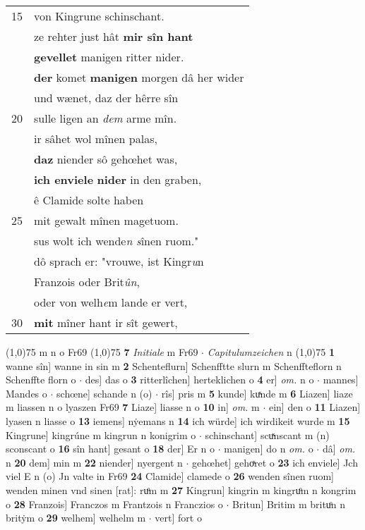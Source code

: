 \documentclass[8pt,a4paper,notitlepage]{article}
\begin{document}
\begin{table}[ht]
\begin{minipage}[t]{0.5\linewidth}
\begin{tabular}{rl}
15 & von Kingrune schinschant.\\ 
 & ze rehter just hât \textbf{mir sîn hant}\\ 
 & \textbf{gevellet} manigen ritter nider.\\ 
 & \textbf{der} komet \textbf{manigen} morgen dâ her wider\\ 
 & und wænet, daz der hêrre sîn\\ 
20 & sulle ligen an \textit{dem} arme mîn.\\ 
 & ir sâhet wol mînen palas,\\ 
 & \textbf{daz} niender sô gehœhet was,\\ 
 & \textbf{ich enviele} \textbf{nider} in den graben,\\ 
 & ê Clamide solte haben\\ 
25 & mit gewalt mînen magetuom.\\ 
 & sus wolt ich wende\textit{n s}înen ruom."\\ 
 & dô sprach er: "vrouwe, ist Kingr\textit{u}n\\ 
 & Franzois oder Brit\textit{ûn},\\ 
 & oder von welh\textit{e}m lande er vert,\\ 
30 & \textbf{mit} mîner hant ir sît gewert,\\ 
\end{tabular}
\scriptsize
\line(1,0){75} \newline
m n o Fr69 \newline
\line(1,0){75} \newline
\textbf{7} \textit{Initiale} m Fr69   $\cdot$ \textit{Capitulumzeichen} n  \newline
\line(1,0){75} \newline
\textbf{1} wanne sîn] wanne in sin m \textbf{2} Schenteflurn] Schenfftte slurn m Schenffteflorn n Schenffte florn o  $\cdot$ des] das o \textbf{3} ritterlîchen] herteklichen o \textbf{4} er] \textit{om.} n o  $\cdot$ mannes] Mandes o  $\cdot$ schœne] schande n (o)  $\cdot$ rîs] pris m \textbf{5} kunde] kuͯnde m \textbf{6} Liazen] liaze m liassen n o lyaszen Fr69 \textbf{7} Liaze] liasse n o \textbf{10} in] \textit{om.} m  $\cdot$ ein] den o \textbf{11} Liazen] lyasen n liasse o \textbf{13} iemens] nẏemans n \textbf{14} ich würde] ich wirdikeit wurde m \textbf{15} Kingrune] kingrúne m kingrun n konigrim o  $\cdot$ schinschant] scuͯnscant m (n) sconscant o \textbf{16} sîn hant] gesant o \textbf{18} der] Er n o  $\cdot$ manigen] do n \textit{om.} o  $\cdot$ dâ] \textit{om.} n \textbf{20} dem] min m \textbf{22} niender] nyergent n  $\cdot$ gehœhet] gehoͯret o \textbf{23} ich enviele] Jch viel E n (o) Jn valte in Fr69 \textbf{24} Clamide] clamede o \textbf{26} wenden sînen ruom] wenden minen vnd sinen [rat]: ruͦm m \textbf{27} Kingrun] kingrin m kingruͦm n kongrim o \textbf{28} Franzois] Franczos m Frantzois n Franczios o  $\cdot$ Britun] Britim m brituͦn n britẏm o \textbf{29} welhem] welhelm m  $\cdot$ vert] fort o \newline
\end{minipage}
\end{table}
\end{document}
